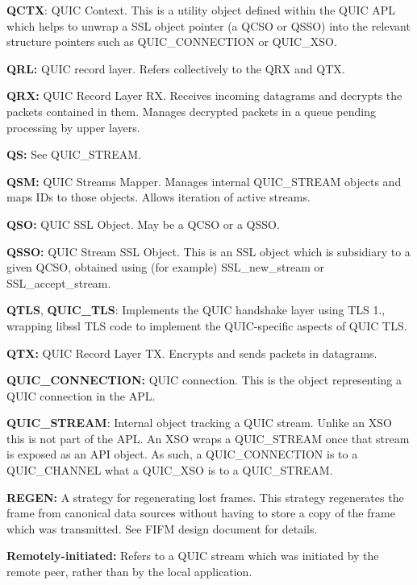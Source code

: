 {\bfseries{QCTX}}\+: QUIC Context. This is a utility object defined within the QUIC APL which helps to unwrap a SSL object pointer (a QCSO or QSSO) into the relevant structure pointers such as {\ttfamily QUIC\+\_\+\+CONNECTION} or {\ttfamily QUIC\+\_\+\+XSO}.

{\bfseries{QRL\+:}} QUIC record layer. Refers collectively to the QRX and QTX.

{\bfseries{QRX\+:}} QUIC Record Layer RX. Receives incoming datagrams and decrypts the packets contained in them. Manages decrypted packets in a queue pending processing by upper layers.

{\bfseries{QS\+:}} See {\ttfamily QUIC\+\_\+\+STREAM}.

{\bfseries{QSM\+:}} QUIC Streams Mapper. Manages internal {\ttfamily QUIC\+\_\+\+STREAM} objects and maps IDs to those objects. Allows iteration of active streams.

{\bfseries{QSO\+:}} QUIC SSL Object. May be a QCSO or a QSSO.

{\bfseries{QSSO\+:}} QUIC Stream SSL Object. This is an SSL object which is subsidiary to a given QCSO, obtained using (for example) {\ttfamily SSL\+\_\+new\+\_\+stream} or {\ttfamily SSL\+\_\+accept\+\_\+stream}.

{\bfseries{QTLS}}, {\bfseries{QUIC\+\_\+\+TLS}}\+: Implements the QUIC handshake layer using TLS 1., wrapping libssl TLS code to implement the QUIC-\/specific aspects of QUIC TLS.

{\bfseries{QTX\+:}} QUIC Record Layer TX. Encrypts and sends packets in datagrams.

{\bfseries{QUIC\+\_\+\+CONNECTION\+:}} QUIC connection. This is the object representing a QUIC connection in the APL.

{\bfseries{QUIC\+\_\+\+STREAM}}\+: Internal object tracking a QUIC stream. Unlike an XSO this is not part of the APL. An XSO wraps a QUIC\+\_\+\+STREAM once that stream is exposed as an API object. As such, a {\ttfamily QUIC\+\_\+\+CONNECTION} is to a {\ttfamily QUIC\+\_\+\+CHANNEL} what a {\ttfamily QUIC\+\_\+\+XSO} is to a {\ttfamily QUIC\+\_\+\+STREAM}.

{\bfseries{REGEN\+:}} A strategy for regenerating lost frames. This strategy regenerates the frame from canonical data sources without having to store a copy of the frame which was transmitted. See FIFM design document for details.

{\bfseries{Remotely-\/initiated\+:}} Refers to a QUIC stream which was initiated by the remote peer, rather than by the local application.

